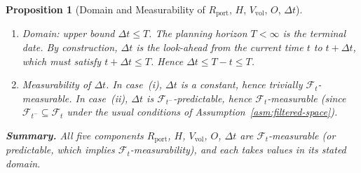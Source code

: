 \documentclass[12pt,openany]{book}
\newcommand{\calF}{\mathcal{F}}
\numberwithin{equation}{chapter}
\theoremstyle{plain}
\newtheorem{proposition}[theorem]{Proposition}
\theoremstyle{definition}
\theoremstyle{remark}
\numberwithin{equation}{chapter}
\theoremstyle{plain}
\begin{document}
\begin{proposition}[Domain and Measurability of $R_{\mathrm{port}}$,
  $H$, $V_{\mathrm{vol}}$, $O$, $\Delta t$]
\begin{enumerate}
\begin{enumerate}
      \item \emph{Domain: upper bound $\Delta t \leq T$.}
        The planning horizon $T < \infty$ is the terminal date.
        By construction, $\Delta t$ is the look-ahead from the
        current time $t$ to $t + \Delta t$, which must satisfy
        $t + \Delta t \leq T$.
        Hence $\Delta t \leq T - t \leq T$.

      \item \emph{Measurability of $\Delta t$.}
        In case~(i), $\Delta t$ is a constant, hence trivially
        $\calF_t$-measurable.
        In case~(ii), $\Delta t$ is
        $\calF_{t^-}$-predictable, hence $\calF_t$-measurable
        (since $\calF_{t^-} \subseteq \calF_t$ under the usual
        conditions of Assumption~\ref{asm:filtered-space}).
    \end{enumerate}

\end{enumerate}

\noindent
\textbf{Summary.}
All five components $R_{\mathrm{port}}$, $H$, $V_{\mathrm{vol}}$,
$O$, $\Delta t$ are $\calF_t$-measurable (or predictable, which
implies $\calF_t$-measurability), and each takes values in its
stated domain.
\end{proposition}
\end{document}
